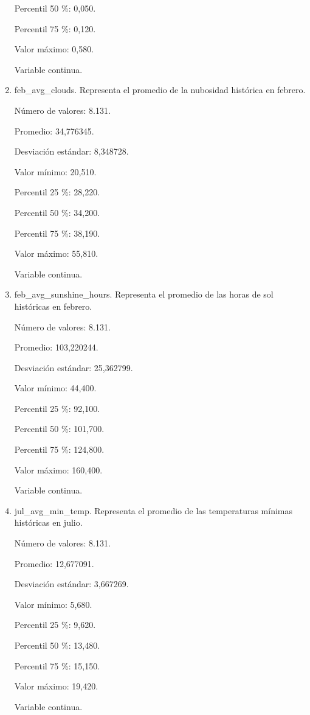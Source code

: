 \begin{enumerate}
	Percentil 50 \%: 0,050.
	
	Percentil 75 \%: 0,120.
	
	Valor máximo: 0,580.
	
	Variable continua.

	\item feb\_avg\_clouds. Representa el promedio de la nubosidad histórica en febrero.
	
	Número de valores: 8.131.
	
	Promedio: 34,776345.
	
	Desviación estándar: 8,348728.
	
	Valor mínimo: 20,510.
	
	Percentil 25 \%: 28,220.
	
	Percentil 50 \%: 34,200.
	
	Percentil 75 \%: 38,190.
	
	Valor máximo: 55,810.
	
	Variable continua.

	\item feb\_avg\_sunshine\_hours. Representa el promedio de las horas de sol históricas en febrero.
	
	Número de valores: 8.131.
	
	Promedio: 103,220244.
	
	Desviación estándar: 25,362799.
	
	Valor mínimo: 44,400.
	
	Percentil 25 \%: 92,100.
	
	Percentil 50 \%: 101,700.
	
	Percentil 75 \%: 124,800.
	
	Valor máximo: 160,400.
	
	Variable continua.

	\item jul\_avg\_min\_temp. Representa el promedio de las temperaturas mínimas históricas en julio.
	
	Número de valores: 8.131.
	
	Promedio: 12,677091.
	
	Desviación estándar: 3,667269.
	
	Valor mínimo: 5,680.
	
	Percentil 25 \%: 9,620.
	
	Percentil 50 \%: 13,480.
	
	Percentil 75 \%: 15,150.
	
	Valor máximo: 19,420.
	
	Variable continua.


\end{enumerate}

